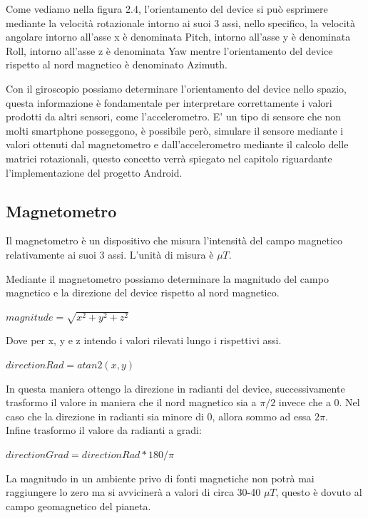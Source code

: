 \documentclass[12pt,a4paper,openright,twoside]{report}
\begin{document}
Come vediamo nella figura 2.4, l'orientamento del device si può esprimere mediante la velocità rotazionale intorno ai suoi 3 assi, nello specifico, la velocità angolare intorno all'asse x è denominata Pitch, intorno all'asse y è denominata Roll, intorno all'asse z è denominata Yaw mentre l'orientamento del device rispetto al nord magnetico è denominato Azimuth.


Con il giroscopio possiamo determinare l'orientamento del device nello spazio, questa informazione è fondamentale per interpretare correttamente i valori prodotti da altri sensori, come l'accelerometro.
E' un tipo di sensore che non molti smartphone posseggono, è possibile però, simulare il sensore mediante i valori ottenuti dal magnetometro e dall'accelerometro mediante il calcolo delle matrici rotazionali, questo concetto verrà spiegato nel capitolo riguardante l'implementazione del progetto Android.
\subsection{Magnetometro}
Il magnetometro è un dispositivo che misura l'intensità del campo magnetico relativamente ai suoi 3 assi. L'unità di misura è $\mu T$. 


Mediante il magnetometro possiamo determinare la magnitudo del campo magnetico e la direzione del device rispetto al nord magnetico.

\begin{center}
$ magnitude = \sqrt{ x^2 + y^2 + z^2}$
\end{center}
Dove per x, y e z intendo i valori rilevati lungo i rispettivi assi.


\begin{center}
$directionRad = atan2(x,y)$
\end{center}


In questa maniera ottengo la direzione in radianti del device, successivamente trasformo il valore in maniera che il nord magnetico sia a $ \pi / 2$ invece che a 0. Nel caso che la direzione in radianti sia minore di 0, allora sommo ad essa  $2\pi $. \\
Infine trasformo il valore da radianti a gradi:

\begin{center}
$directionGrad = directionRad * 180/ \pi$
\end{center}

La magnitudo in un ambiente privo di fonti magnetiche non potrà mai raggiungere lo zero ma si avvicinerà a valori di circa 30-40 $\mu T$, questo è dovuto al campo geomagnetico del pianeta.
\end{document}
